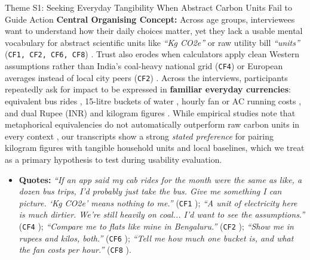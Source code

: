 \documentclass[12pt, a4paper]{article}
\begin{document}
\begin{semanticcard}{Theme S1: Seeking Everyday Tangibility When Abstract Carbon Units Fail to Guide Action}
\textbf{Central Organising Concept:} Across age groups, interviewees want to understand how their daily choices matter, yet they lack a usable mental vocabulary for abstract scientific units like \textit{``Kg CO2e''} or raw utility bill \textit{``units''} (\texttt{CF1, CF2, CF6, CF8}) \cite{khandelwal2019, cf1, cf2, cf6, cf8}. Trust also erodes when calculators apply clean Western assumptions rather than India's coal-heavy national grid (\texttt{CF4}) \cite{cea2023, cf4} or European averages instead of local city peers (\texttt{CF2}) \cite{cf2}. Across the interviews, participants repeatedly ask for impact to be expressed in \textbf{familiar everyday currencies}: equivalent bus rides \cite{cf1}, 15-litre buckets of water \cite{cf1, cf3, cf8}, hourly fan or AC running costs \cite{cf2, cf3, cf8}, and dual Rupee (INR) and kilogram figures \cite{cf6}. While empirical studies note that metaphorical equivalencies do not automatically outperform raw carbon units in every context \cite{grinstein2018, mohanty2023}, our transcripts show a strong \textit{stated preference} for pairing kilogram figures with tangible household units and local baselines, which we treat as a primary hypothesis to test during usability evaluation.
\begin{itemize}
    \item \textbf{Quotes:} \textit{``If an app said my cab rides for the month were the same as like, a dozen bus trips, I'd probably just take the bus. Give me something I can picture. `Kg CO2e' means nothing to me.''} (\texttt{CF1} \cite{cf1}); \textit{``A unit of electricity here is much dirtier. We're still heavily on coal... I'd want to see the assumptions.''} (\texttt{CF4} \cite{cf4}); \textit{``Compare me to flats like mine in Bengaluru.''} (\texttt{CF2} \cite{cf2}); \textit{``Show me in rupees and kilos, both.''} (\texttt{CF6} \cite{cf6}); \textit{``Tell me how much one bucket is, and what the fan costs per hour.''} (\texttt{CF8} \cite{cf8}).
\end{itemize}
\end{semanticcard}
\end{document}
